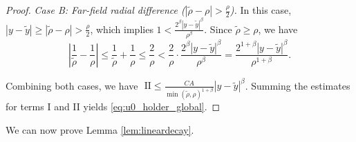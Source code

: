 \documentclass[12pt]{amsart}
\numberwithin{equation}{section}              %
\theoremstyle{remark}
\begin{document}
\begin{proof}
\textit{Case B: Far-field radial difference ($|\tilde{\rho} -\rho| > \frac{\rho}{2}$).}
In this case, $|y-\tilde{y}| \geq |\tilde{\rho} -\rho| > \frac{\rho}{2}$, which implies $1 < \frac{2^\beta |y-\tilde{y}|^\beta}{\rho^\beta}$. Since $\tilde{\rho}  \geq \rho$, we have
\begin{equation*}
    \left| \frac{1}{\tilde{\rho} } - \frac{1}{\rho} \right| \leq \frac{1}{\tilde{\rho} } + \frac{1}{\rho} \leq \frac{2}{\rho} < \frac{2}{\rho} \cdot \frac{2^\beta |y-\tilde{y}|^\beta}{\rho^\beta} = \frac{2^{1+\beta} |y-\tilde{y}|^\beta}{\rho^{1+\beta}}.
\end{equation*}

Combining both cases, we have $\textrm{ II} \leq \frac{C A}{\min(\tilde{\rho} , \rho)^{1+\beta}} |y-\tilde{y}|^\beta$.
Summing the estimates for terms I and  II yields \eqref{eq:u0_holder_global}. %
\end{proof}
We can now prove Lemma \ref{lem:lineardecay}.
\end{document}
